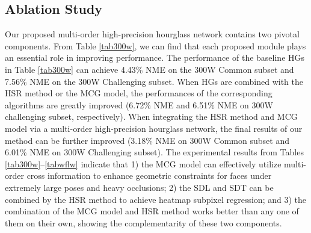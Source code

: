 \documentclass[journal]{IEEEtran}
\begin{document}
\subsection{Ablation Study}
Our proposed multi-order high-precision hourglass network contains two pivotal components. From Table \ref{tab300w}, we can find that each proposed module plays an essential role in improving performance. The performance of the baseline HGs in Table \ref{tab300w} can achieve 4.43\% NME on the 300W Common subset and 7.56\% NME on the 300W Challenging subset. When HGs are combined with the HSR method or the MCG model, the performances of the corresponding algorithms are greatly improved (6.72\% NME and 6.51\% NME on 300W challenging subset, respectively). When integrating the HSR method and MCG model via a multi-order high-precision hourglass network, the final results of our method can be further improved (3.18\% NME on 300W Common subset and 6.01\% NME on 300W Challenging subset). The experimental results from Tables \ref{tab300w}--\ref{tabwflw} indicate that 1) the MCG model can effectively utilize multi-order cross information to enhance geometric constraints for faces under extremely large poses and heavy occlusions; 2) the SDL and SDT can be combined by the HSR method to achieve heatmap subpixel regression; and 3) the combination of the MCG model and HSR method works better than any one of them on their own, showing the complementarity of these two components.
\end{document}
